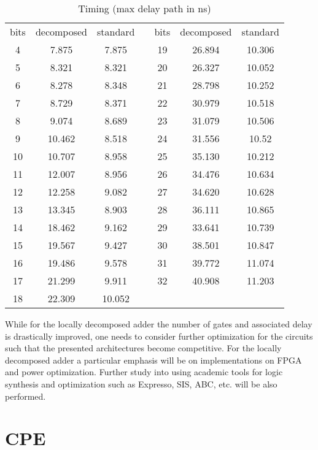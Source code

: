 \documentclass[12pt]{toptesi}
\begin{document}
\begin{table}%
\centering
    \caption{Timing (max delay path in ns)}
		\vspace{6pt}
   \begin{tabular}{ccccccc}
		\toprule
    bits	 & decomposed	 & standard && bits	 & decomposed	 & standard \\ 
    \cmidrule{1-3}\cmidrule{5-7} 
    4	 & 7.875	 & 7.875 && 19	 & 26.894	 & 10.306  \\ 
    5	 & 8.321	 & 8.321 && 20	 & 26.327	 & 10.052  \\ 
    6	 & 8.278	 & 8.348 && 21	 & 28.798	 & 10.252  \\ 
    7	 & 8.729	 & 8.371 && 22	 & 30.979	 & 10.518  \\ 
    8	 & 9.074	 & 8.689 && 23	 & 31.079	 & 10.506  \\ 
    9	 & 10.462	 & 8.518 && 24	 & 31.556	 & 10.52 \\ 
    10	 & 10.707	 & 8.958 && 25	 & 35.130	 & 10.212 \\ 
    11	 & 12.007	 & 8.956 && 26	 & 34.476	 & 10.634 \\ 
    12	 & 12.258	 & 9.082 && 27	 & 34.620	 & 10.628 \\ 
    13	 & 13.345	 & 8.903 && 28	 & 36.111	 & 10.865 \\ 
    14	 & 18.462	 & 9.162 && 29	 & 33.641	 & 10.739 \\ 
    15	 & 19.567	 & 9.427 && 30	 & 38.501	 & 10.847 \\ 
    16	 & 19.486	 & 9.578 && 31	 & 39.772	 & 11.074 \\ 
    17	 & 21.299	 & 9.911 && 32	 & 40.908	 & 11.203 \\ 
    18	 & 22.309	 & 10.052 &&  \\ 
\bottomrule
    \end{tabular}
    \label{tab:fpga_timing}
\end{table}

While for the locally decomposed adder the number of gates and associated delay is drastically improved, one needs to consider further optimization for the circuits such that the presented architectures become competitive. For the locally decomposed adder a particular emphasis will be on implementations on FPGA and power optimization. Further study into using academic tools for logic synthesis and optimization such as Expresso, SIS, ABC, etc. will be also performed. 


\chapter{CPE}
\end{document}
